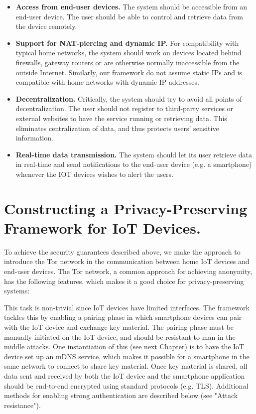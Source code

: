 \begin{itemize}
	\item \textbf{Access from end-user devices.} The system should be accessible from an end-user device. The user should be able to control and retrieve data from the device remotely. 
	\item \textbf{Support for NAT-piercing and dynamic IP.}  For compatibility with typical home networks, the system should work on devices located behind firewalls, gateway routers or are otherwise normally inaccessible from the outside Internet. Similarly, our framework do not assume static IPs and is compatible with home networks with dynamic IP addresses.
	\item \textbf{Decentralization.} Critically, the system should try to avoid all points of decentralization. The user should not register to third-party services or external websites to have the service running or retrieving data. This eliminates centralization of data, and thus protects users' sensitive information.
	\item \textbf{Real-time data transmission.} The system should let its user retrieve data in real-time and send notifications to the end-user device (e.g. a smartphone) whenever the IOT devices wishes to alert the users.
\end{itemize}



\section{Constructing a Privacy-Preserving Framework for IoT Devices.}
To achieve the security guarantees described above, we make the approach to introduce the Tor network in the communication between home IoT devices and end-user devices. The Tor network, a common approach for achieving anonymity\cite{dingledine2004tor}, has the following features, which makes it a good choice for privacy-preserving systems:


 This task is non-trivial since IoT devices have limited interfaces. The framework tackles this by enabling a pairing phase in which smartphone devices can pair with the IoT device and exchange key material. The pairing phase must be manually initiated on the IoT device, and should be resistant to man-in-the-middle attacks. One instantiation of this (see next Chapter) is to have the IoT device set up an mDNS service, which makes it possible for a smartphone in the same network to connect to share key material. Once key material is shared, all data sent and received by both the IoT device and the smartphone application should be end-to-end encrypted using standard protocols (e.g. TLS). Additional methods for enabling strong authentication are described below (see "Attack resistance").

